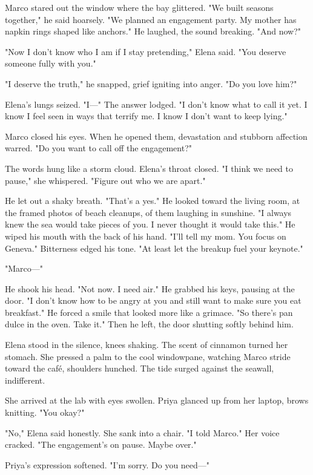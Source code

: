 Marco stared out the window where the bay glittered. "We built seasons together," he said hoarsely. "We planned an engagement party. My mother has napkin rings shaped like anchors." He laughed, the sound breaking. "And now?"

"Now I don't know who I am if I stay pretending," Elena said. "You deserve someone fully with you."

"I deserve the truth," he snapped, grief igniting into anger. "Do you love him?"

Elena's lungs seized. "I—" The answer lodged. "I don't know what to call it yet. I know I feel seen in ways that terrify me. I know I don't want to keep lying."

Marco closed his eyes. When he opened them, devastation and stubborn affection warred. "Do you want to call off the engagement?"

The words hung like a storm cloud. Elena's throat closed. "I think we need to pause," she whispered. "Figure out who we are apart."

He let out a shaky breath. "That's a yes." He looked toward the living room, at the framed photos of beach cleanups, of them laughing in sunshine. "I always knew the sea would take pieces of you. I never thought it would take this." He wiped his mouth with the back of his hand. "I'll tell my mom. You focus on Geneva." Bitterness edged his tone. "At least let the breakup fuel your keynote."

"Marco—"

He shook his head. "Not now. I need air." He grabbed his keys, pausing at the door. "I don't know how to be angry at you and still want to make sure you eat breakfast." He forced a smile that looked more like a grimace. "So there's pan dulce in the oven. Take it." Then he left, the door shutting softly behind him.

Elena stood in the silence, knees shaking. The scent of cinnamon turned her stomach. She pressed a palm to the cool windowpane, watching Marco stride toward the café, shoulders hunched. The tide surged against the seawall, indifferent.

She arrived at the lab with eyes swollen. Priya glanced up from her laptop, brows knitting. "You okay?"

"No," Elena said honestly. She sank into a chair. "I told Marco." Her voice cracked. "The engagement's on pause. Maybe over."

Priya's expression softened. "I'm sorry. Do you need—"

